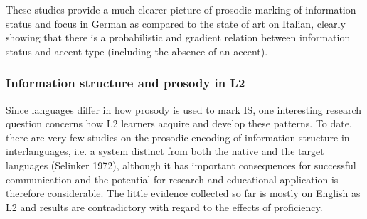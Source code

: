 \begin{styleStandard}
These studies provide a much clearer picture of prosodic marking of information status and focus in German as compared to the state of art on Italian, clearly showing that there is a probabilistic and gradient relation between information status and accent type (including the absence of an accent).
\end{styleStandard}

\subsubsection[Information structure and prosody in L2]{Information structure and prosody in L2}
\hypertarget{Toc191305889}{}\begin{styleStandard}
Since languages differ in how prosody is used to mark IS, one interesting research question concerns how L2 learners acquire and develop these patterns. To date, there are very few studies on the prosodic encoding of information structure in interlanguages, i.e. a system distinct from both the native and the target languages (Selinker 1972), although it has important consequences for successful communication and the potential for research and educational application is therefore considerable. The little evidence collected so far is mostly on English as L2 and results are contradictory with regard to the effects of proficiency.
\end{styleStandard}

